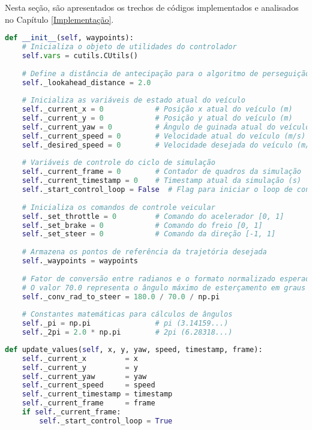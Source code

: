 \documentclass[
	12pt,				%
	oneside, %
	a4paper,			%
	english,			%
	french,				%
	spanish,			%
	brazil				%
	]{abntex2}
\begin{document}
\begin{apendicesenv}
Nesta seção, são apresentados os trechos de códigos implementados e analisados no Capítulo \ref{Implementação}.

\begin{lstlisting}[language=Python, caption=Construtor da classe Controller2D., label=lst:controller-init]
def __init__(self, waypoints):
    # Inicializa o objeto de utilidades do controlador
    self.vars = cutils.CUtils()
    
    # Define a distância de antecipação para o algoritmo de perseguição pura (em metros)
    self._lookahead_distance = 2.0
    
    # Inicializa as variáveis de estado atual do veículo
    self._current_x = 0            # Posição x atual do veículo (m)
    self._current_y = 0            # Posição y atual do veículo (m)
    self._current_yaw = 0          # Ângulo de guinada atual do veículo (rad)
    self._current_speed = 0        # Velocidade atual do veículo (m/s)
    self._desired_speed = 0        # Velocidade desejada do veículo (m/s)
    
    # Variáveis de controle do ciclo de simulação
    self._current_frame = 0        # Contador de quadros da simulação
    self._current_timestamp = 0    # Timestamp atual da simulação (s)
    self._start_control_loop = False  # Flag para iniciar o loop de controle
    
    # Inicializa os comandos de controle veicular
    self._set_throttle = 0         # Comando do acelerador [0, 1]
    self._set_brake = 0            # Comando do freio [0, 1]
    self._set_steer = 0            # Comando da direção [-1, 1]
    
    # Armazena os pontos de referência da trajetória desejada
    self._waypoints = waypoints
    
    # Fator de conversão entre radianos e o formato normalizado esperado pelo simulador
    # O valor 70.0 representa o ângulo máximo de esterçamento em graus
    self._conv_rad_to_steer = 180.0 / 70.0 / np.pi
    
    # Constantes matemáticas para cálculos de ângulos
    self._pi = np.pi               # pi (3.14159...)
    self._2pi = 2.0 * np.pi        # 2pi (6.28318...)
\end{lstlisting}

\begin{lstlisting}[language=Python, caption=Método de atualização de estado do controlador., label=lst:controller-update]
def update_values(self, x, y, yaw, speed, timestamp, frame):
    self._current_x         = x
    self._current_y         = y
    self._current_yaw       = yaw
    self._current_speed     = speed
    self._current_timestamp = timestamp
    self._current_frame     = frame
    if self._current_frame:
        self._start_control_loop = True
\end{lstlisting}


\end{apendicesenv}
\end{document}
